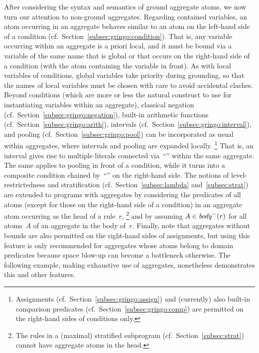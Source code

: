 After considering the syntax and semantics of ground aggregate atoms,
we now turn our attention to non-ground aggregates.
Regarding contained variables, an atom occurring in an aggregate behaves
similar to an atom on the left-hand side of a condition
(cf.\ Section~\ref{subsec:gringo:condition}).
That is, any variable occurring within an aggregate is a priori local,
and it must be bound via a variable of the same name that is global
or that occurs on the right-hand side of a condition
(with the atom containing the variable in front).
As with local variables of conditions, global variables take priority
during grounding, so that the names of local variables must be chosen
with care to avoid accidental clashes.
Beyond conditions (which are more or less the natural construct to use
for instantiating variables within an aggregate),
classical negation (cf.\ Section~\ref{subsec:gringo:negation}),
built-in arithmetic functions (cf.\ Section~\ref{subsec:gringo:arith}),
intervals (cf.\ Section~\ref{subsec:gringo:interval}), and 
pooling (cf.\ Section~\ref{subsec:gringo:pool})
can be incorporated as usual within aggregates,
where intervals and pooling are expanded locally.%
\footnote{%
  Assignments (cf.\ Section~\ref{subsec:gringo:assign}) and (currently)
  also built-in comparison predicates (cf.\ Section~\ref{subsec:gringo:comp})
  are permitted on the right-hand sides of conditions only.}
That is, an interval gives rise to multiple literals connected via~``\code{,}''
within the same aggregate.
The same applies to pooling in front of a condition,
while it turns into a composite condition chained by~``\code{:}'' on the right-hand side.
The notions of level-restrictedness and stratification
(cf.\ Section~\ref{subsec:lambda} and~\ref{subsec:strat}) are extended
to programs with aggregates by
considering the predicates of all atoms (except for those on the right-hand side of a condition)
in an aggregate atom occurring as the head of a rule~$r$,%
\footnote{%
  The rules in a (maximal) stratified subprogram (cf.\ Section~\ref{subsec:strat})
  cannot have aggregate atoms in the head.}
and by assuming $A\in\mathit{body}^-(r)$ for all atoms~$A$ of an aggregate in the body of~$r$.
Finally, note that aggregates without bounds are also permitted on the
right-hand sides of assignments, but using this feature is only recommended
for aggregates whose atoms belong to domain predicates because space blow-up
can become a bottleneck otherwise.
The following example, making exhaustive use of aggregates,
nonetheless demonstrates this and other features.

